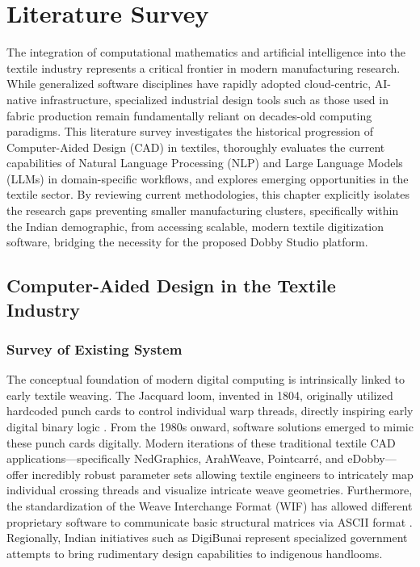 \chapter{Literature Survey}

The integration of computational mathematics and artificial intelligence into the textile industry represents a critical frontier in modern manufacturing research. While generalized software disciplines have rapidly adopted cloud-centric, AI-native infrastructure, specialized industrial design tools such as those used in fabric production remain fundamentally reliant on decades-old computing paradigms. This literature survey investigates the historical progression of Computer-Aided Design (CAD) in textiles, thoroughly evaluates the current capabilities of Natural Language Processing (NLP) and Large Language Models (LLMs) in domain-specific workflows, and explores emerging opportunities in the textile sector. By reviewing current methodologies, this chapter explicitly isolates the research gaps preventing smaller manufacturing clusters, specifically within the Indian demographic, from accessing scalable, modern textile digitization software, bridging the necessity for the proposed Dobby Studio platform.

\section{Computer-Aided Design in the Textile Industry}

\subsection{Survey of Existing System}
The conceptual foundation of modern digital computing is intrinsically linked to early textile weaving. The Jacquard loom, invented in 1804, originally utilized hardcoded punch cards to control individual warp threads, directly inspiring early digital binary logic \cite{ref1}. From the 1980s onward, software solutions emerged to mimic these punch cards digitally. Modern iterations of these traditional textile CAD applications—specifically NedGraphics, ArahWeave, Pointcarré, and eDobby—offer incredibly robust parameter sets allowing textile engineers to intricately map individual crossing threads and visualize intricate weave geometries. Furthermore, the standardization of the Weave Interchange Format (WIF) has allowed different proprietary software to communicate basic structural matrices via ASCII format \cite{ref2}. Regionally, Indian initiatives such as DigiBunai represent specialized government attempts to bring rudimentary design capabilities to indigenous handlooms.

